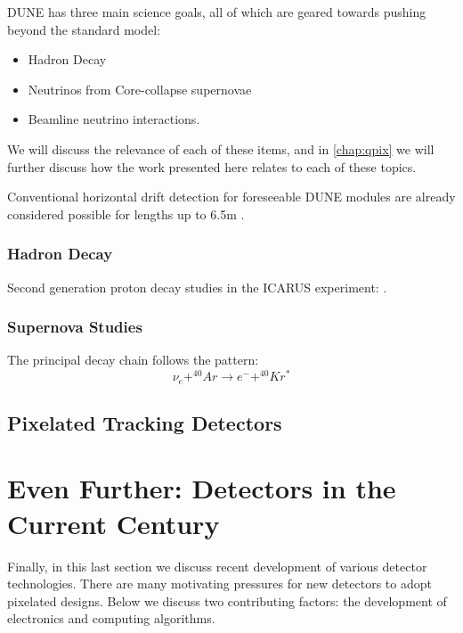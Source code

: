 DUNE has three main science goals, all of which are geared towards pushing beyond the standard model:
\begin{itemize}
    \item Hadron Decay
    \item Neutrinos from Core-collapse supernovae
    \item Beamline neutrino interactions.
\end{itemize}

We will discuss the relevance of each of these items, and in \ref{chap:qpix} we will further discuss how the work presented here relates to each of these topics. 


Conventional horizontal drift detection for foreseeable DUNE modules are already considered possible for lengths up to 6.5m \citep{DUNE_Vertical:Paulucci_2022}.


\subsubsection{Hadron Decay}
\label{sect:intro_decay}

Second generation proton decay studies in the ICARUS experiment: \citep{ICARUS_2001}.


\subsubsection{Supernova Studies}
\label{sect:intro_supernova}

The principal decay chain follows the pattern:
\begin{equation}
    \nu_{e} + ^{40}Ar \rightarrow e^- + ^{40}Kr^*
\end{equation}


\subsection{Pixelated Tracking Detectors}

\section{Even Further: Detectors in the Current Century}

Finally, in this last section we discuss recent development of various detector technologies.
There are many motivating pressures for new detectors to adopt pixelated designs. 
Below we discuss two contributing factors: the development of electronics and computing algorithms.

